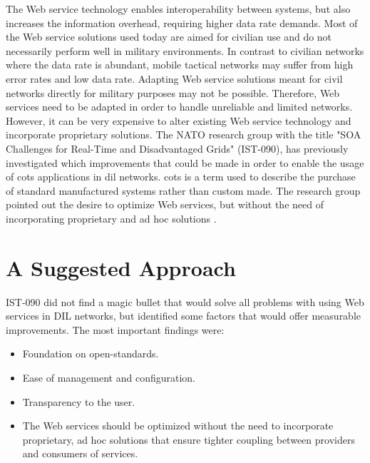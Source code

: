 The Web service technology enables interoperability between systems, but also
increases the information overhead, requiring higher data rate demands. Most of
the Web service solutions used today are aimed for civilian use and do not
necessarily perform well in military environments. In contrast to civilian
networks where the data rate is abundant, mobile tactical networks may suffer
from high error rates and low data rate. Adapting Web service solutions meant
for civil networks directly for military purposes may not be possible.
Therefore, Web services need to be adapted in order to handle unreliable and
limited networks. However, it can be very expensive to alter existing Web
service technology and incorporate proprietary solutions. The NATO research
group with the title "SOA Challenges for Real-Time and Disadvantaged Grids"
(IST-090), has previously investigated which improvements that could be made in
order to enable the usage of \gls{cots} applications in \gls{dil} networks.
\Gls{cots} is a term used to describe the purchase of standard manufactured
systems rather than custom made. The research group pointed out the desire to
optimize Web services, but without the need of incorporating proprietary and ad
hoc solutions \cite{ist-090}.


\section{A Suggested Approach}
\label{section:hypothesis}

IST-090 did not find a magic bullet that would solve all problems with using Web
services in DIL networks, but identified some factors that would offer measurable
improvements. The most important findings were:

\begin{itemize}

    \item Foundation on open-standards.

    \item Ease of management and configuration.

    \item Transparency to the user.

    \item The Web services should be optimized without the need to incorporate
    proprietary, ad hoc solutions that ensure tighter coupling between providers
    and consumers of services.

\end{itemize}


